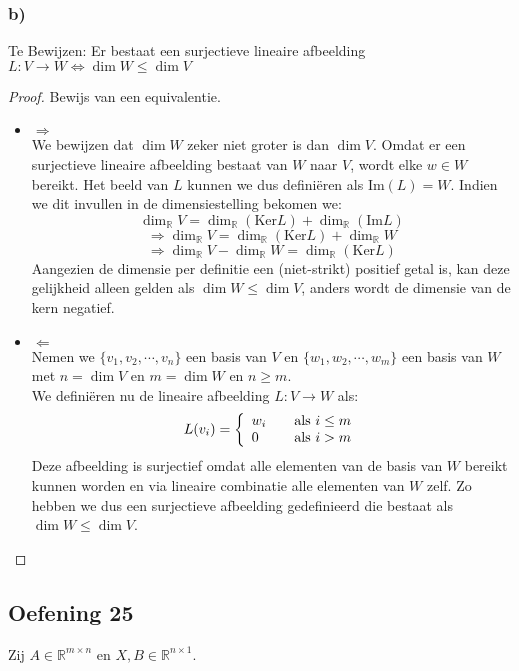 \documentclass[lineaire_algebra_oplossingen.tex]{subfiles}
\begin{document}
\subsubsection*{b)}
Te Bewijzen:
Er bestaat een surjectieve lineaire afbeelding $L:V\rightarrow W \Leftrightarrow \dim W\le \dim V$
\begin{proof}
Bewijs van een equivalentie.
\begin{itemize}
\item $\Rightarrow$\\
We bewijzen dat $\dim W$ zeker niet groter is dan $\dim V$. Omdat er een surjectieve lineaire afbeelding bestaat van $W$ naar $V$, wordt elke $w\in W$ bereikt. Het beeld van $L$ kunnen we dus defini\"eren als $\text{Im}(L)=W$. Indien we dit invullen in de dimensiestelling bekomen we:
\[\dim_{\mathbb{R}} V = \dim_{\mathbb{R}} (\text{Ker}L) + \dim_{\mathbb{R}} (\text{Im}L)\]
\[\Rightarrow \dim_{\mathbb{R}} V = \dim_{\mathbb{R}} (\text{Ker}L) + \dim_{\mathbb{R}} W\]
\[\Rightarrow \dim_{\mathbb{R}} V - \dim_{\mathbb{R}} W= \dim_{\mathbb{R}} (\text{Ker}L)\]
Aangezien de dimensie per definitie een (niet-strikt) positief getal is, kan deze gelijkheid alleen gelden als $\dim W \leq \dim V$, anders wordt de dimensie van de kern negatief.
\item $\Leftarrow$\\
Nemen we $\{v_1,v_2,\cdots,v_n\}$ een basis van $V$ en $\{w_1,w_2,\cdots,w_m\}$ een basis van $W$ met $n=\dim V$ en $m=\dim W$ en $n \geq m$.\\
We defini\"eren nu de lineaire afbeelding $L:V \rightarrow W$ als:
\[ L(v_i) = \left\{
  \begin{array}{l l}
    w_i & \quad \text{als $i \leq m$}\\
    0 & \quad \text{als $i > m$}\\
  \end{array} \right.
\]
Deze afbeelding is surjectief omdat alle elementen van de basis van $W$ bereikt kunnen worden en via lineaire combinatie alle elementen van $W$ zelf. Zo hebben we dus een surjectieve afbeelding gedefinieerd die bestaat als $\dim W \leq \dim V$.
\end{itemize}
\end{proof}


\subsection{Oefening 25}
Zij $A \in \mathbb{R}^{m\times n}$ en $X,B \in \mathbb{R}^{n\times 1}$.
\end{document}
